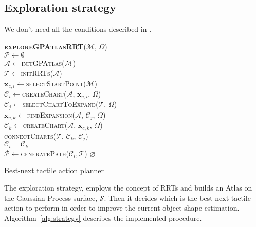 \subsection{Exploration strategy}
\label{sec:strategy}

We don't need all the conditions described in \citet[Fig.~8]{Jaillet2013Path}.

\begin{algorithm}[h]
\textbf{\textsc{exploreGPAtlasRRT}}($\mathcal{M}$, $\Omega$)\\ %
\LinesNumbered
\DontPrintSemicolon
\SetAlgoVlined {} 
  $\mathcal{P} \leftarrow \emptyset$ \\
  $\mathcal{A} \leftarrow$\textsc{initGPAtlas}($\mathcal{M}$) \\
  $\mathcal{T} \leftarrow$\textsc{initRRTs}($\mathcal{A}$) \\
  $\mathbf{x}_{c,i} \leftarrow$\textsc{selectStartPoint}($\mathcal{M}$)\\
  $\mathcal{C}_{i} \leftarrow$\textsc{createChart}($\mathcal{A}$, $\mathbf{x}_{c,i}$, $\Omega$)\\
  {
    $\mathcal{C}_{j} \leftarrow$\textsc{selectChartToExpand}($\mathcal{T}$, $\Omega$) \\
    $\mathbf{x}_{c,k} \leftarrow$\textsc{findExpansion}($\mathcal{A}$, $\mathcal{C}_{j}$, $\Omega$) \\ 
    $\mathcal{C}_{k} \leftarrow$\textsc{createChart}($\mathcal{A}$, $\mathbf{x}_{c,k}$, $\Omega$) \\ 
    \textsc{connectCharts}($\mathcal{T}$, $\mathcal{C}_{k}$, $\mathcal{C}_{j}$) \\
    $\mathcal{C}_{i} = \mathcal{C}_{k}$ \\
  }
  {\Return $\mathcal{P} \leftarrow$\textsc{generatePath}($\mathcal{C}_{i}, \mathcal{T}$)}
  {\Return $\varnothing$}
\caption{Best-next tactile action planner} \label{alg:strategy}
\end{algorithm}

The exploration strategy, employs  the concept of RRTs and builds
an Atlas on  the Gaussian Process surface, $\mathcal{S}$. Then  it decides which
is  the  best next  tactile  action  to perform  in  order to improve the  current
object shape estimation.  Algorithm~\ref{alg:strategy}  describes  the
implemented procedure.

